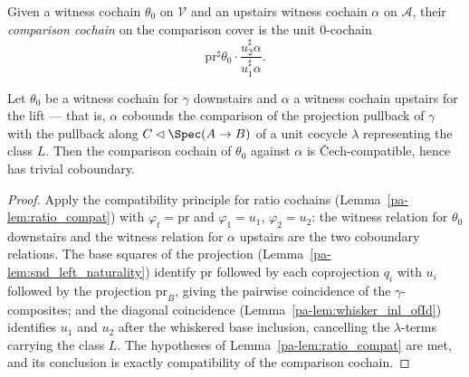 \begin{definition}
  \label{pa-def:comparisonCochain}
  \leanok

  Given a witness cochain \(\theta_0\) on \(\mathcal V\) and an upstairs witness cochain
  \(\alpha\) on \(\mathcal A\), their \emph{comparison cochain} on the comparison cover is the
  unit \(0\)-cochain
  \[
    \mathrm{pr}^{\sharp}\theta_0 \cdot
      \frac{u_2^{\sharp}\alpha}{u_1^{\sharp}\alpha} .
  \]
\end{definition}

\begin{theorem}
  \label{pa-thm:comparisonCochain_compat}
  \leanok

  Let \(\theta_0\) be a witness cochain for \(\gamma\) downstairs and \(\alpha\) a witness
  cochain upstairs for the lift — that is, \(\alpha\) cobounds the comparison of the projection
  pullback of \(\gamma\) with the pullback along \(C \lhd \Spec(A \to B)\) of a unit cocycle
  \(\lambda\) representing the class \(L\). Then the comparison cochain of \(\theta_0\) against
  \(\alpha\) is \v Cech-compatible, hence has trivial coboundary.
\end{theorem}
\begin{proof}
  \leanok
  Apply the compatibility principle for ratio cochains (Lemma~\ref{pa-lem:ratio_compat}) with
  \(\varphi_t = \mathrm{pr}\) and \(\varphi_1 = u_1\), \(\varphi_2 = u_2\): the witness relation
  for \(\theta_0\) downstairs and the witness relation for \(\alpha\) upstairs are the two
  coboundary relations. The base squares of the projection
  (Lemma~\ref{pa-lem:snd_left_naturality}) identify \(\mathrm{pr}\) followed by each coprojection
  \(q_i\) with \(u_i\) followed by the projection \(\mathrm{pr}_B\), giving the pairwise
  coincidence of the \(\gamma\)-composites; and the diagonal coincidence
  (Lemma~\ref{pa-lem:whisker_inl_ofId}) identifies \(u_1\) and \(u_2\) after the whiskered base
  inclusion, cancelling the \(\lambda\)-terms carrying the class \(L\). The hypotheses of
  Lemma~\ref{pa-lem:ratio_compat} are met, and its conclusion is exactly compatibility of the
  comparison cochain.
\end{proof}

